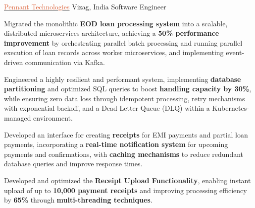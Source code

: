 \documentclass[10pt]{article}
\begin{document}
\headedsection
{\href{https://www.pennanttech.com/}{\textcolor{db5c31}{Pennant Technologies}}}
{Vizag, India}
{Software Engineer}
{}{
\vspace{-2.4ex}
\begin{circlist}
    \item Migrated the monolithic \textbf{EOD loan processing system} into a scalable, distributed microservices architecture, achieving a \textbf{50\% performance improvement} by orchestrating parallel batch processing and running parallel execution of loan records across worker microservices, and implementing event-driven communication via Kafka.
    \vspace{1mm}  
    \item Engineered a highly resilient and performant system, implementing \textbf{database partitioning} and optimized SQL queries to boost \textbf{handling capacity by 30\%}, while ensuring zero data loss through idempotent processing, retry mechanisms with exponential backoff, and a Dead Letter Queue (DLQ) within a Kubernetes-managed environment.
    \vspace{1mm}  
    \item Developed an interface for creating \textbf{receipts} for EMI payments and partial loan payments, incorporating a \textbf{real-time notification system} for upcoming payments and confirmations, with \textbf{caching mechanisms} to reduce redundant database queries and improve response times.
    \vspace{1mm}  
    \item Developed and optimized the \textbf{Receipt Upload Functionality}, enabling instant upload of up to \textbf{10,000 payment receipts} and improving processing efficiency by \textbf{65\%} through \textbf{multi-threading techniques}.
\end{circlist}
}
\spacedhrule{0.8ex}{0.0ex}


\begin{indentsection}
     \vspace{1mm}  
     \vspace{1mm}  
     \vspace{1mm}  
     \vspace{1mm}  
\end{indentsection}
\spacedhrule{0.8ex}{0.0ex}
\end{document}
